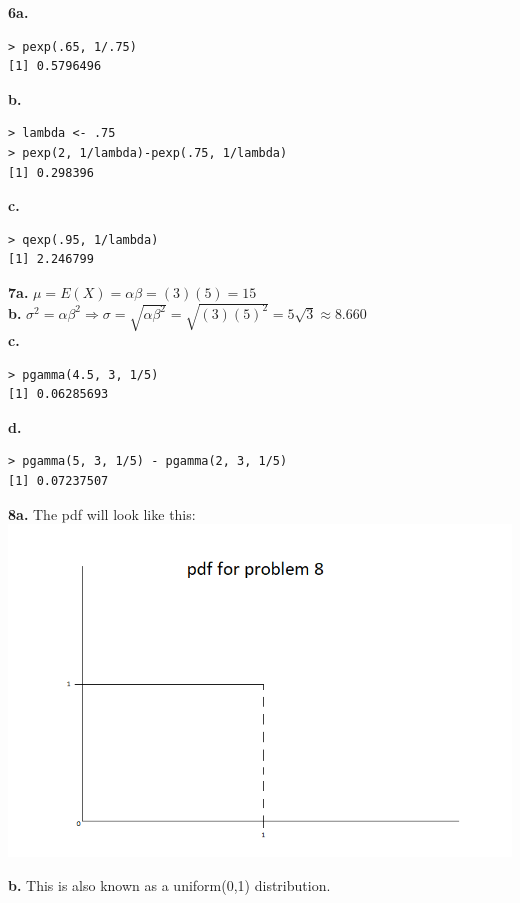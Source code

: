 \documentclass[12pt]{report}
\begin{document}
\noindent \textbf{6a.} 
\begin{verbatim}
> pexp(.65, 1/.75)
[1] 0.5796496
\end{verbatim}

\noindent \textbf{b.}
\begin{verbatim}
> lambda <- .75
> pexp(2, 1/lambda)-pexp(.75, 1/lambda)
[1] 0.298396
\end{verbatim}

\pagebreak
\noindent \textbf{c.} 
\begin{verbatim}
> qexp(.95, 1/lambda)
[1] 2.246799
\end{verbatim}

\noindent \textbf{7a.} $\mu = E(X) = \alpha\beta = (3)(5) = \boxed{15}$\\
\noindent \textbf{b.} $\sigma^2 = \alpha\beta^2 \Rightarrow \sigma = \sqrt{\alpha\beta^2} = \sqrt{(3)(5)^2} = 5\sqrt{3} \approx \boxed{8.660}$\\
\noindent \textbf{c.} 
\begin{verbatim}
> pgamma(4.5, 3, 1/5)
[1] 0.06285693
\end{verbatim}

\noindent \textbf{d.}
\begin{verbatim}
> pgamma(5, 3, 1/5) - pgamma(2, 3, 1/5)
[1] 0.07237507
\end{verbatim}

\noindent \textbf{8a.} The pdf will look like this:\\ 
\includegraphics[scale = .7]{hw3_8}

\noindent \textbf{b.} This is also known as a uniform(0,1) distribution.
\end{document}
